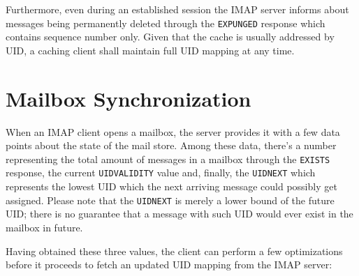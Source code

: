 \documentclass[trojita]{subfiles}
\begin{document}
Furthermore, even during an established session the IMAP server informs about messages being permanently deleted through
the {\tt EXPUNGED} response which contains sequence number only.  Given that the cache is usually addressed by UID, a
caching client shall maintain full UID mapping at any time.

\section{Mailbox Synchronization}
\label{sec:imap-mailbox-sync}

When an IMAP client opens a mailbox, the server provides it with a few data points about the state of the mail store.
Among these data, there's a number representing the total amount of messages in a mailbox through the {\tt EXISTS}
response, the current {\tt UIDVALIDITY} value and, finally, the {\tt UIDNEXT} which represents the lowest UID which the
next arriving message could possibly get assigned.  Please note that the {\tt UIDNEXT} is merely a lower bound of the
future UID; there is no guarantee that a message with such UID would ever exist in the mailbox in future.

Having obtained these three values, the client can perform a few optimizations before it proceeds to fetch an updated
UID mapping from the IMAP server:
\end{document}
